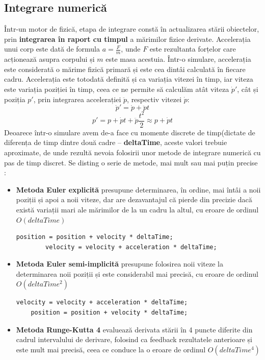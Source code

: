 \documentclass[12pt,a4paper]{report}
\begin{document}
\subsection{Integrare numerică}
Într-un motor de fizică, etapa de integrare constă în actualizarea stării obiectelor, prin \textbf{integrarea în raport cu timpul} a mărimilor fizice derivate. Accelerația unui corp este dată de formula $ a = \frac{F}{m} $, unde $F$ este rezultanta forțelor care acționează asupra corpului și $m$ este masa acestuia. Într-o simulare, accelerația este considerată o mărime fizică primară și este cea dintâi calculată în fiecare cadru. Accelerația este totodată definită și ca variația vitezei în timp, iar viteza este variația poziției în timp, ceea ce ne permite să calculăm atât viteza $\dot{p}'$, cât și poziția $p'$, prin integrarea accelerației $\ddot{p}$, respectiv vitezei $\dot{p}$:
$$ \dot{p}' = \dot{p} + \ddot{p}t $$
$$ p' = p + \dot{p}t + \ddot{p}\frac{t^2}{2} \approx p + \dot{p}t $$
Deoarece într-o simulare avem de-a face cu momente discrete de timp(dictate de diferența de timp dintre două cadre -- \textbf{deltaTime}, aceste valori trebuie aproximate, de unde rezultă nevoia folosirii unor metode de integrare numerică cu pas de timp discret.
Se disting o serie de metode, mai mult sau mai puțin precise \cite{integration_gaffer}:
\begin{itemize}
	\item \textbf{Metoda Euler explicită}\cite{explicit_euler} presupune determinarea, în ordine, mai întâi a noii poziții și apoi a noii viteze, dar are dezavantajul că pierde din precizie dacă există variații mari ale mărimilor de la un cadru la altul, cu eroare de ordinul $O(deltaTime)$
	\begin{lstlisting}[style=myC++]
		position = position + velocity * deltaTime;
		velocity = velocity + acceleration * deltaTime;
	\end{lstlisting}
	\item \textbf{Metoda Euler semi-implicită}\cite{implicit_euler}\label{inline_implicit_euler} presupune folosirea noii viteze la determinarea noii poziții și este considerabil mai precisă, cu eroare de ordinul $O(deltaTime^2)$
	\begin{lstlisting}[style=myC++]
	velocity = velocity + acceleration * deltaTime;
	position = position + velocity * deltaTime;
	\end{lstlisting}
	\item \textbf{Metoda Runge-Kutta 4}\cite{runge_kutta} evaluează derivata stării în 4 puncte diferite din cadrul intervalului de derivare, folosind ca feedback rezultatele anterioare și este mult mai precisă, ceea ce conduce la o eroare de ordinul $O(deltaTime^4)$
\end{itemize}
\end{document}
